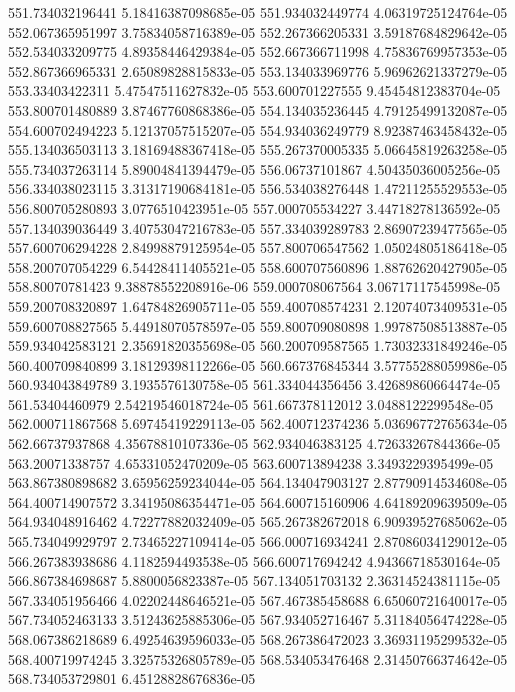 {551.734032196441 5.18416387098685e-05
551.934032449774 4.06319725124764e-05
552.067365951997 3.75834058716389e-05
552.267366205331 3.59187684829642e-05
552.534033209775 4.89358446429384e-05
552.667366711998 4.75836769957353e-05
552.867366965331 2.65089828815833e-05
553.134033969776 5.96962621337279e-05
553.33403422311 5.47547511627832e-05
553.600701227555 9.45454812383704e-05
553.800701480889 3.87467760868386e-05
554.134035236445 4.79125499132087e-05
554.600702494223 5.12137057515207e-05
554.934036249779 8.92387463458432e-05
555.134036503113 3.18169488367418e-05
555.267370005335 5.06645819263258e-05
555.734037263114 5.89004841394479e-05
556.06737101867 4.50435036005256e-05
556.334038023115 3.31317190684181e-05
556.534038276448 1.47211255529553e-05
556.800705280893 3.0776510423951e-05
557.000705534227 3.44718278136592e-05
557.134039036449 3.40753047216783e-05
557.334039289783 2.86907239477565e-05
557.600706294228 2.84998879125954e-05
557.800706547562 1.05024805186418e-05
558.200707054229 6.54428411405521e-05
558.600707560896 1.88762620427905e-05
558.80070781423 9.38878552208916e-06
559.000708067564 3.06717117545998e-05
559.200708320897 1.64784826905711e-05
559.400708574231 2.12074073409531e-05
559.600708827565 5.44918070578597e-05
559.800709080898 1.99787508513887e-05
559.934042583121 2.35691820355698e-05
560.200709587565 1.73032331849246e-05
560.400709840899 3.18129398112266e-05
560.667376845344 3.57755288059986e-05
560.934043849789 3.1935576130758e-05
561.334044356456 3.42689860664474e-05
561.53404460979 2.54219546018724e-05
561.667378112012 3.0488122299548e-05
562.000711867568 5.69745419229113e-05
562.400712374236 5.03696772765634e-05
562.66737937868 4.35678810107336e-05
562.934046383125 4.72633267844366e-05
563.20071338757 4.65331052470209e-05
563.600713894238 3.3493229395499e-05
563.867380898682 3.65956259234044e-05
564.134047903127 2.87790914534608e-05
564.400714907572 3.34195086354471e-05
564.600715160906 4.64189209639509e-05
564.934048916462 4.72277882032409e-05
565.267382672018 6.90939527685062e-05
565.734049929797 2.73465227109414e-05
566.000716934241 2.87086034129012e-05
566.267383938686 4.1182594493538e-05
566.600717694242 4.94366718530164e-05
566.867384698687 5.8800056823387e-05
567.134051703132 2.36314524381115e-05
567.334051956466 4.02202448646521e-05
567.467385458688 6.65060721640017e-05
567.734052463133 3.51243625885306e-05
567.934052716467 5.31184056474228e-05
568.067386218689 6.49254639596033e-05
568.267386472023 3.36931195299532e-05
568.400719974245 3.32575326805789e-05
568.534053476468 2.31450766374642e-05
568.734053729801 6.45128828676836e-05
}
